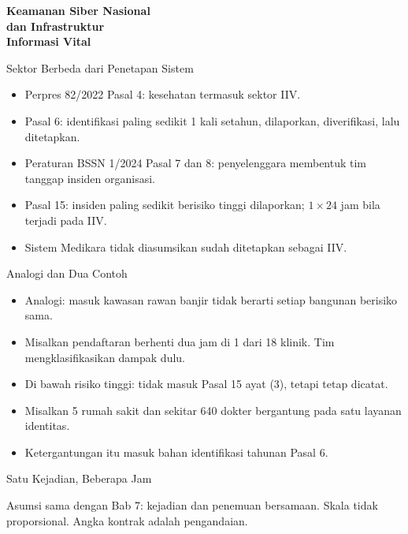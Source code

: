 \documentclass[aspectratio=169, table, 12pt]{beamer}
\begin{document}
\begin{frame}{\hfill}
  \centering
  \Huge{\textbf{Keamanan Siber Nasional\\dan Infrastruktur\\Informasi Vital}}
\end{frame}

\begin{frame}{{\Large Sektor Berbeda dari Penetapan Sistem}}
  \vspace{4pt}
  \small
  \begin{itemize}
    \item Perpres 82/2022 Pasal 4: kesehatan termasuk sektor IIV.
    \item Pasal 6: identifikasi paling sedikit 1 kali setahun, dilaporkan, diverifikasi, lalu ditetapkan.
    \item Peraturan BSSN 1/2024 Pasal 7 dan 8: penyelenggara membentuk tim tanggap insiden organisasi.
    \item Pasal 15: insiden paling sedikit berisiko tinggi dilaporkan; $1 \times 24$ jam bila terjadi pada IIV.
    \item Sistem Medikara tidak diasumsikan sudah ditetapkan sebagai IIV.
  \end{itemize}
\end{frame}

\begin{frame}{{\Large Analogi dan Dua Contoh}}
  \vspace{4pt}
  \small
  \begin{itemize}
    \item Analogi: masuk kawasan rawan banjir tidak berarti setiap bangunan berisiko sama.
    \item Misalkan pendaftaran berhenti dua jam di 1 dari 18 klinik. Tim mengklasifikasikan dampak dulu.
    \item Di bawah risiko tinggi: tidak masuk Pasal 15 ayat (3), tetapi tetap dicatat.
    \item Misalkan 5 rumah sakit dan sekitar 640 dokter bergantung pada satu layanan identitas.
    \item Ketergantungan itu masuk bahan identifikasi tahunan Pasal 6.
  \end{itemize}
\end{frame}

\begin{frame}{{\Large Satu Kejadian, Beberapa Jam}}
  \centering
  \resizebox{0.97\textwidth}{!}{}

  \vspace{8pt}
  \raggedright\small Asumsi sama dengan Bab 7: kejadian dan penemuan bersamaan. Skala tidak proporsional.
  Angka kontrak adalah pengandaian.
\end{frame}
\end{document}
